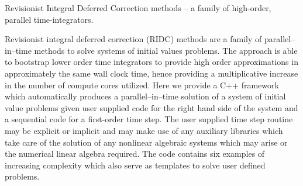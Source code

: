 Revisionist Integral Deferred Correction methods -- a family of high-\/order, parallel time-\/integrators.

Revisionist integral deferred correction (R\+I\+D\+C) methods are a family of parallel--in--time methods to solve systems of initial values problems. The approach is able to bootstrap lower order time integrators to provide high order approximations in approximately the same wall clock time, hence providing a multiplicative increase in the number of compute cores utilized. Here we provide a C++ framework which automatically produces a parallel--in--time solution of a system of initial value problems given user supplied code for the right hand side of the system and a sequential code for a first-\/order time step. The user supplied time step routine may be explicit or implicit and may make use of any auxiliary libraries which take care of the solution of any nonlinear algebraic systems which may arise or the numerical linear algebra required. The code contains six examples of increasing complexity which also serve as templates to solve user defined problems. 